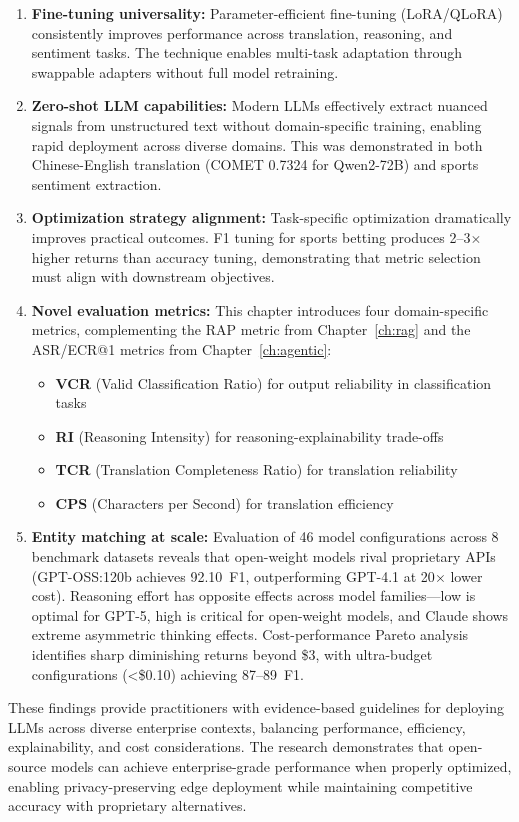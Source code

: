 \begin{enumerate}[leftmargin=*]
    \item \textbf{Fine-tuning universality:} Parameter-efficient fine-tuning (LoRA/QLoRA) consistently improves performance across translation, reasoning, and sentiment tasks. The technique enables multi-task adaptation through swappable adapters without full model retraining.
    
    \item \textbf{Zero-shot LLM capabilities:} Modern LLMs effectively extract nuanced signals from unstructured text without domain-specific training, enabling rapid deployment across diverse domains. This was demonstrated in both Chinese-English translation (COMET 0.7324 for Qwen2-72B) and sports sentiment extraction.
    
    \item \textbf{Optimization strategy alignment:} Task-specific optimization dramatically improves practical outcomes. F1 tuning for sports betting produces 2--3$\times$ higher returns than accuracy tuning, demonstrating that metric selection must align with downstream objectives.
    
    \item \textbf{Novel evaluation metrics:} This chapter introduces four domain-specific metrics, complementing the RAP metric from Chapter~\ref{ch:rag} and the ASR/ECR@1 metrics from Chapter~\ref{ch:agentic}:
    \begin{itemize}
        \item \textbf{VCR} (Valid Classification Ratio) for output reliability in classification tasks
        \item \textbf{RI} (Reasoning Intensity) for reasoning-explainability trade-offs
        \item \textbf{TCR} (Translation Completeness Ratio) for translation reliability
        \item \textbf{CPS} (Characters per Second) for translation efficiency
    \end{itemize}

    \item \textbf{Entity matching at scale:} Evaluation of 46 model configurations across 8 benchmark datasets reveals that open-weight models rival proprietary APIs (GPT-OSS:120b achieves 92.10~F1, outperforming GPT-4.1 at 20$\times$ lower cost).  Reasoning effort has opposite effects across model families---low is optimal for GPT-5, high is critical for open-weight models, and Claude shows extreme asymmetric thinking effects.  Cost-performance Pareto analysis identifies sharp diminishing returns beyond \$3, with ultra-budget configurations (\textless\$0.10) achieving 87--89~F1.
\end{enumerate}

These findings provide practitioners with evidence-based guidelines for deploying LLMs across diverse enterprise contexts, balancing performance, efficiency, explainability, and cost considerations. The research demonstrates that open-source models can achieve enterprise-grade performance when properly optimized, enabling privacy-preserving edge deployment while maintaining competitive accuracy with proprietary alternatives.